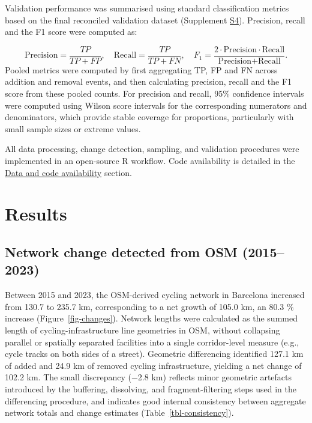 \documentclass[
]{article}
\begin{document}
Validation performance was summarised using standard classification
metrics based on the final reconciled validation dataset (Supplement
\hyperref[s4-joined-results]{S4}). Precision, recall and the F1 score
were computed as:

\[
\text{Precision}=\frac{TP}{TP+FP},\quad
\text{Recall}=\frac{TP}{TP+FN},\quad
F_1=\frac{2\cdot \text{Precision}\cdot \text{Recall}}{\text{Precision}+\text{Recall}}.
\] Pooled metrics were computed by first aggregating TP, FP and FN
across addition and removal events, and then calculating precision,
recall and the F1 score from these pooled counts. For precision and
recall, 95\% confidence intervals were computed using Wilson score
intervals for the corresponding numerators and denominators, which
provide stable coverage for proportions, particularly with small sample
sizes or extreme values.

All data processing, change detection, sampling, and validation
procedures were implemented in an open-source R workflow. Code
availability is detailed in the \hyperref[s1-code]{Data and code
availability} section.

\section{Results}\label{results}

\subsection{Network change detected from OSM
(2015--2023)}\label{network-change-detected-from-osm-20152023}

Between 2015 and 2023, the OSM-derived cycling network in Barcelona
increased from 130.7 to 235.7 km, corresponding to a net growth of 105.0
km, an 80.3 \% increase (Figure~\ref{fig-changes}). Network lengths were
calculated as the summed length of cycling-infrastructure line
geometries in OSM, without collapsing parallel or spatially separated
facilities into a single corridor-level measure (e.g., cycle tracks on
both sides of a street). Geometric differencing identified 127.1 km of
added and 24.9 km of removed cycling infrastructure, yielding a net
change of 102.2 km. The small discrepancy (−2.8 km) reflects minor
geometric artefacts introduced by the buffering, dissolving, and
fragment-filtering steps used in the differencing procedure, and
indicates good internal consistency between aggregate network totals and
change estimates (Table~\ref{tbl-consistency}).
\end{document}
